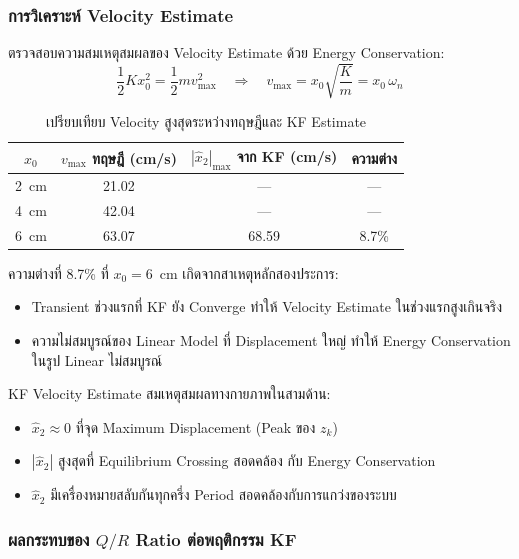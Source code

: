 \subsubsection{การวิเคราะห์ Velocity Estimate}

ตรวจสอบความสมเหตุสมผลของ Velocity Estimate ด้วย Energy Conservation:
\begin{equation}
    \frac{1}{2}Kx_0^2 = \frac{1}{2}mv_\text{max}^2
    \quad \Rightarrow \quad
    v_\text{max} = x_0\sqrt{\frac{K}{m}} = x_0\,\omega_n
    \label{eq:v_max_theory}
\end{equation}

\begin{table}[htbp]
    \centering
    \caption{เปรียบเทียบ Velocity สูงสุดระหว่างทฤษฎีและ KF Estimate}
    \label{tab:velocity_comparison}
    \begin{tabular}{cccc}
        \hline
        $x_0$ & $v_\text{max}$ ทฤษฎี (cm/s) & $|\hat{x}_2|_\text{max}$ จาก KF (cm/s) & ความต่าง \\
        \hline
        2~cm & 21.02 & --- & --- \\
        4~cm & 42.04 & --- & --- \\
        6~cm & 63.07 & 68.59 & 8.7\% \\
        \hline
    \end{tabular}
\end{table}

ความต่างที่ 8.7\% ที่ $x_0 = 6$~cm เกิดจากสาเหตุหลักสองประการ:
\begin{itemize}
    \item Transient ช่วงแรกที่ KF ยัง Converge ทำให้ Velocity Estimate
          ในช่วงแรกสูงเกินจริง
    \item ความไม่สมบูรณ์ของ Linear Model ที่ Displacement ใหญ่
          ทำให้ Energy Conservation ในรูป Linear ไม่สมบูรณ์
\end{itemize}

KF Velocity Estimate สมเหตุสมผลทางกายภาพในสามด้าน:
\begin{itemize}
    \item $\hat{x}_2 \approx 0$ ที่จุด Maximum Displacement (Peak ของ $z_k$)
    \item $|\hat{x}_2|$ สูงสุดที่ Equilibrium Crossing สอดคล้อง
          กับ Energy Conservation
    \item $\hat{x}_2$ มีเครื่องหมายสลับกันทุกครึ่ง Period
          สอดคล้องกับการแกว่งของระบบ
\end{itemize}

\subsubsection{ผลกระทบของ $Q/R$ Ratio ต่อพฤติกรรม KF}

